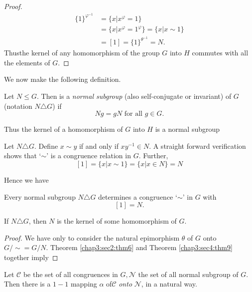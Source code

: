 \begin{proof}
  \begin{align*}
    \{ 1 \}^{\varphi^{-1}} & = \bigg\{ x \big| x^\varphi = 1\bigg\}\\
    & = \bigg\{ x \big| x^\varphi = 1^\varphi \bigg\} = \bigg\{ x
    \big| x \sim 1\bigg\}\\ 
    & = [1] = \bigg\{ 1\bigg\}^{\theta {^{-1}}} = N.
  \end{align*}
  Thus\pageoriginale the kernel of any homomorphism of the group $G$ into $H$ commutes
  with all the elements of $G$. 
\end{proof}

We now make the following definition.

\begin{defi*}
  Let $N \le G$. Then is a {\em normal subgroup} (also self-conjugate
  or invariant) of $G$ (notation $N \triangle G$) if 
  $$
  Ng = gN \text { for all } g \in G.
  $$

  Thus the kernel of a homomorphism of $G$ into $H$ is a normal subgroup 
\end{defi*}

Let $N \triangle G$. Define $x \sim y$ if and only if $xy^{-1}
\in  N$. A straight forward verification shows that `$\sim$' is
a congruence relation in $G$. Further, 
$$
[1] = \bigg\{ x \big| x \sim 1\bigg\} =\bigg\{ x \big| x \in  N
\bigg\} = N 
$$

Hence we have
\begin{theorem}\label{chap3:sec4:thm9} %
  Every normal subgroup $N \triangle G$ determines a congruence `$\sim$'
  in $G$ with 
  $$
  [1] = N.
  $$
\end{theorem}

\begin{coro*}
  If $N \triangle G$, then $N$ is the kernel of some homomorphism of $G$. 
\end{coro*}

\begin{proof}
  We have only to consider the natural epimorphism $\theta$ of $G$
  onto $G/ \sim = G/N$. Theorem \ref{chap3:sec2:thm6} and Theorem
  \ref{chap3:sec4:thm9} together imply 
\end{proof}

\begin{theorem}\label{chap3:sec4:thm10} %
  Let $\mathscr{C}$ be the set of all congruences in $G, \mathscr{N}$
  the set of all normal subgroup of $G$. Then there is a $1-1$ mapping
  $\alpha$ of\pageoriginale $\mathscr{C}$ {\em onto} $\mathscr{N}$, in
  a natural way.  
\end{theorem}

